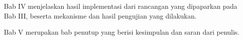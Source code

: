 Bab IV menjelaskan hasil implementasi dari rancangan yang dipaparkan pada Bab III, beserta mekanisme dan hasil pengujian yang dilakukan.

Bab V merupakan bab penutup yang berisi kesimpulan dan saran dari penulis.

%
